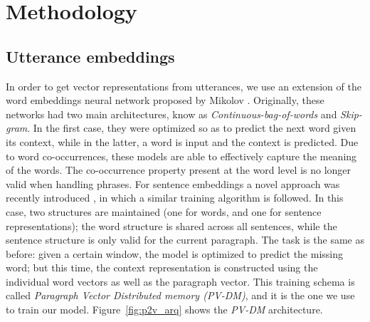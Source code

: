 \section{Methodology}\label{sec:method}
%

\subsection{Utterance embeddings} 
In order to get vector representations from utterances, we use an extension of the word embeddings neural network proposed by Mikolov . Originally, these networks had two main architectures, know as \emph{Continuous-bag-of-words} and \emph{Skip-gram}. In the first case, they were optimized so as to predict the next word given its context, while in the latter, a word is input and the context is predicted. Due to word co-occurrences, these models are able to effectively capture the meaning of the words. The co-occurrence property present at the word level is no longer valid when handling phrases. For sentence embeddings a novel approach was recently introduced , in which a similar training algorithm is followed. In this case, two structures are maintained (one for words, and one for sentence representations); the word structure is shared across all sentences, while the sentence structure is only valid for the current paragraph. The task is the same as before: given a certain window, the model is optimized to predict the missing word; but this time, the context representation is constructed using the individual word vectors as well as the paragraph vector. This training schema is called \emph{Paragraph Vector Distributed memory (PV-DM)}, and it is the one we use to train our model. Figure~\ref{fig:p2v_arq} shows the \emph{PV-DM} architecture.

